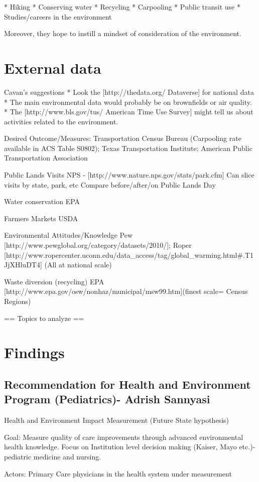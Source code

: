 \documentclass{article}
\begin{document}
* Hiking
* Conserving water
* Recycling
* Carpooling
* Public transit use
* Studies/careers in the environment

Moreover, they hope to instill a mindset of consideration of the environment.

\section{External data}
Cavan's suggestions
* Look the [http://thedata.org/ Dataverse] for national data
* The main environmental data would probably be on brownfields or air quality.
* The [http://www.bls.gov/tus/ American Time Use Survey] might tell us about activities related to the environment.


Desired Outcome/Measures:
Transportation
Census Bureau (Carpooling rate available in ACS Table S0802); Texas Transportation Institute; American Public Transportation Association
 
Public Lands Visits
 NPS - [http://www.nature.nps.gov/stats/park.cfm]
Can slice visits by state, park, etc
Compare before/after/on Public Lands Day


Water conservation
EPA
 
Farmers Markets
USDA
 
Environmental Attitudes/Knowledge
Pew [http://www.pewglobal.org/category/datasets/2010/]; Roper [http://www.ropercenter.uconn.edu/data_access/tag/global_warming.html#.T1JjXHluDT4] (All at national scale)
 
Waste diversion (recycling)
EPA [http://www.epa.gov/osw/nonhaz/municipal/msw99.htm](finest scale= Census Regions)

== Topics to analyze ==

\section{Findings}
\subsection{Recommendation for Health and Environment Program (Pediatrics)- Adrish Sannyasi}


Health and Environment Impact Measurement (Future State hypothesis)

Goal: Measure quality of care improvements through advanced environmental health knowledge. Focus on Institution level decision making (Kaiser, Mayo etc.)- pediatric medicine and nursing.

Actors: Primary Care physicians in the health system under measurement
\end{document}

